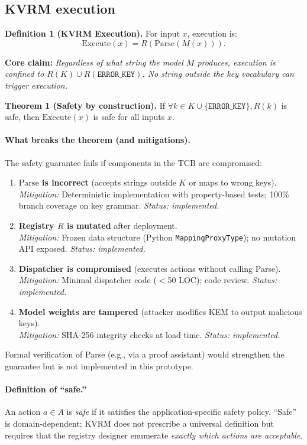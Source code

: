 \documentclass[11pt]{article}
\begin{document}
\subsection{KVRM execution}
\textbf{Definition 1 (KVRM Execution).}
For input $x$, execution is:
\[
\mathrm{Execute}(x) = R(\mathrm{Parse}(M(x))).
\]

\noindent\textbf{Core claim:} \emph{Regardless of what string the model $M$ produces, execution is confined to $R(K) \cup R(\texttt{ERROR\_KEY})$. No string outside the key vocabulary can trigger execution.}

\textbf{Theorem 1 (Safety by construction).}
If $\forall k \in K \cup \{\texttt{ERROR\_KEY}\}, R(k)$ is safe, then $\mathrm{Execute}(x)$ is safe for all inputs $x$.

\paragraph{What breaks the theorem (and mitigations).}
The safety guarantee fails if components in the TCB are compromised:
\begin{enumerate}[leftmargin=*]
  \item \textbf{$\mathrm{Parse}$ is incorrect} (accepts strings outside $K$ or maps to wrong keys).\\
  \emph{Mitigation:} Deterministic implementation with property-based tests; 100\% branch coverage on key grammar. \emph{Status: implemented.}
  \item \textbf{Registry $R$ is mutated} after deployment.\\
  \emph{Mitigation:} Frozen data structure (Python \texttt{MappingProxyType}); no mutation API exposed. \emph{Status: implemented.}
  \item \textbf{Dispatcher is compromised} (executes actions without calling Parse).\\
  \emph{Mitigation:} Minimal dispatcher code ($<$50 LOC); code review. \emph{Status: implemented.}
  \item \textbf{Model weights are tampered} (attacker modifies KEM to output malicious keys).\\
  \emph{Mitigation:} SHA-256 integrity checks at load time. \emph{Status: implemented.}
\end{enumerate}
Formal verification of Parse (e.g., via a proof assistant) would strengthen the guarantee but is not implemented in this prototype.

\paragraph{Definition of ``safe.''}
An action $a \in A$ is \emph{safe} if it satisfies the application-specific safety policy.
``Safe'' is domain-dependent; KVRM does not prescribe a universal definition but requires that the registry designer enumerate \emph{exactly which actions are acceptable}.
\end{document}
